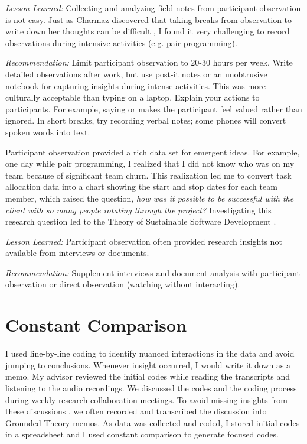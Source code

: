 \textit{Lesson Learned:} Collecting and analyzing field notes from participant observation is not easy. Just as Charmaz discovered that taking breaks from observation to write down her thoughts can be difficult \cite{Charmaz}, I found it very challenging to record observations during intensive activities (e.g. pair-programming). 

\textit{Recommendation:} Limit participant observation to 20-30 hours per week. Write detailed observations after work, but use post-it notes or an unobtrusive notebook for capturing insights during intense activities. This was more culturally acceptable than typing on a laptop. Explain your actions to participants. For example, saying  or  makes the participant feel valued rather than ignored. In short breaks, try recording verbal notes; some phones will convert spoken words into text.

Participant observation provided a rich data set for emergent ideas. For example, one day while pair programming, I realized that I did not know who was on my team because of significant team churn. This realization led me to convert task allocation data into a chart showing the start and stop dates for each team member, which raised the question, \textit{how was it possible to be successful \cite{RalphDimensionsOfSuccess} with the client with so many people rotating through the project?} Investigating this research question led to the Theory of Sustainable Software Development \cite{SedanoSustainableSoftware}.

\textit{Lesson Learned:} Participant observation often provided research insights not available from interviews or documents.

\textit{Recommendation:} Supplement interviews and document analysis with participant observation or direct observation (watching without interacting). 

\section{Constant Comparison}
\label{ConstantComparison}
I used line-by-line coding \cite{Charmaz} to identify nuanced interactions in the data and avoid jumping to conclusions. Whenever insight occurred, I would write it down as a memo. My advisor reviewed the initial codes while reading the transcripts and listening to the audio recordings. We discussed the codes and the coding process during weekly research collaboration meetings. To avoid missing insights from these discussions \cite{GlaserTheoreticalSensitivity}, we often recorded and transcribed the discussion into Grounded Theory memos. As data was collected and coded, I stored initial codes in a spreadsheet and I used constant comparison to generate focused codes.

